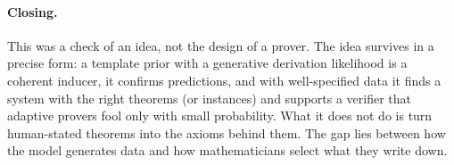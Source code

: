 \paragraph{Closing.} This was a check of an idea, not the design of a prover. The idea survives in a precise form: a template prior with a generative derivation likelihood is a coherent inducer, it confirms predictions, and with well-specified data it finds a system with the right theorems (or instances) and supports a verifier that adaptive provers fool only with small probability. What it does not do is turn human-stated theorems into the axioms behind them. The gap lies between how the model generates data and how mathematicians select what they write down.
